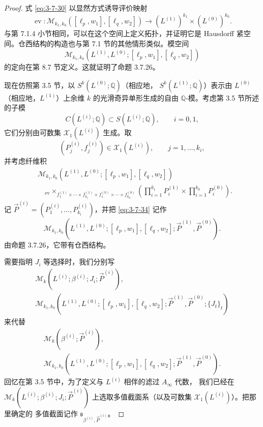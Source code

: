 \begin{proof}
式 \eqref{eq:3-7-30} 以显然方式诱导评价映射
\begin{equation}
 \operatorname{ev}\colon
 \mathcal M_{k_1,k_0}([\ell_p,w_1],[\ell_q,w_2])
 \longrightarrow (L^{(1)})^{k_1}\times(L^{(0)})^{k_0}.
\tag{3.7.33}\label{eq:3-7-33}
\end{equation}
与第 7.1.4 小节相同，可以在这个空间上定义拓扑，并证明它是 Hausdorff
紧空间。仓西结构的构造也与第 7.1 节的其他情形类似。模空间
\[
 \mathcal M_{k_1,k_0}
 (L^{(1)},L^{(0)};[\ell_p,w_1],[\ell_q,w_2])
\]
的定向在第 8.7 节定义。这就证明了命题 3.7.26。

现在仿照第 3.5 节，以 $S^k(L^{(0)};\mathbb Q)$（相应地，
$S^k(L^{(1)};\mathbb Q)$）表示由 $L^{(0)}$（相应地，$L^{(1)}$）上余维
$k$ 的光滑奇异单形生成的自由 $\mathbb Q$-模。考虑第 3.5 节所述的子模
\[
 C(L^{(i)};\mathbb Q)\subset S(L^{(i)};\mathbb Q),
 \qquad i=0,1,
\]
它们分别由可数集 $\mathcal X_1(L^{(i)})$ 生成。取
\[
 (P_j^{(i)},f_j^{(i)})\in\mathcal X_1(L^{(i)}),
 \qquad j=1,\ldots,k_i,
\]
并考虑纤维积
\begin{equation}
\begin{aligned}
&\mathcal M_{k_1,k_0}
 (L^{(1)},L^{(0)};[\ell_p,w_1],[\ell_q,w_2])\\[-0.2em]
&\quad{}_{\operatorname{ev}}
 \!\times_{
 f_1^{(1)}\times\cdots\times f_{k_1}^{(1)}
 \times f_1^{(0)}\times\cdots\times f_{k_0}^{(0)}}
 \left(
  \prod_{i=1}^{k_1}P_i^{(1)}
  \times\prod_{i=1}^{k_0}P_i^{(0)}
 \right).
\end{aligned}
\tag{3.7.34}\label{eq:3-7-34}
\end{equation}
记 $\vec P^{(i)}=(P_1^{(i)},\ldots,P_{k_i}^{(i)})$，并把
\eqref{eq:3-7-34} 记作
\begin{equation}
 \mathcal M_{k_1,k_0}
 (L^{(1)},L^{(0)};[\ell_p,w_1],[\ell_q,w_2];
 \vec P^{(1)},\vec P^{(0)}).
\tag{3.7.35}\label{eq:3-7-35}
\end{equation}
由命题 3.7.26，它带有仓西结构。

需要指明 $J_i$ 等选择时，我们分别写
\[
\begin{gathered}
 \mathcal M_k(L^{(i)};\beta^{(i)};J_i;\vec P^{(i)}),\\
 \mathcal M_{k_1,k_0}
 (L^{(1)},L^{(0)};[\ell_p,w_1],[\ell_q,w_2];
 \vec P^{(1)},\vec P^{(0)};\{J_t\}_t)
\end{gathered}
\]
来代替
\[
\begin{gathered}
 \mathcal M_k(\beta^{(i)};\vec P^{(i)}),\\
 \mathcal M_{k_1,k_0}
 (L^{(1)},L^{(0)};[\ell_p,w_1],[\ell_q,w_2];
 \vec P^{(1)},\vec P^{(0)}).
\end{gathered}
\]
回忆在第 3.5 节中，为了定义与 $L^{(i)}$ 相伴的滤过 $A_\infty$ 代数，
我们已经在
$\mathcal M_k(L^{(i)};\beta^{(i)};J_i;\vec P^{(i)})$
上选取多值截面系（以及可数集 $\mathcal X_1(L^{(i)})$）。把那里确定的
多值截面记作 $\mathfrak s_{\beta^{(i)},\vec P^{(i)}}$。


\end{proof}
